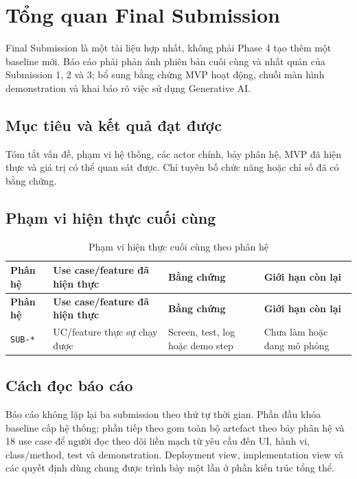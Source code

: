 \section{Tổng quan Final Submission}

Final Submission là một tài liệu hợp nhất, không phải Phase 4 tạo thêm một baseline mới. Báo cáo phải phản ánh phiên bản cuối cùng và nhất quán của Submission 1, 2 và 3; bổ sung bằng chứng MVP hoạt động, chuỗi màn hình demonstration và khai báo rõ việc sử dụng Generative AI.

\subsection{Mục tiêu và kết quả đạt được}

Tóm tắt vấn đề, phạm vi hệ thống, các actor chính, bảy phân hệ, MVP đã hiện thực và giá trị có thể quan sát được. Chỉ tuyên bố chức năng hoặc chỉ số đã có bằng chứng.

\subsection{Phạm vi hiện thực cuối cùng}

\begin{longtable}{|L{25mm}|L{42mm}|L{38mm}|L{30mm}|}
  \caption{Phạm vi hiện thực cuối cùng theo phân hệ}\\
  \hline
  \textbf{Phân hệ} & \textbf{Use case/feature đã hiện thực} & \textbf{Bằng chứng} & \textbf{Giới hạn còn lại}\\\hline
  \endfirsthead
  \hline
  \textbf{Phân hệ} & \textbf{Use case/feature đã hiện thực} & \textbf{Bằng chứng} & \textbf{Giới hạn còn lại}\\\hline
  \endhead
  \texttt{SUB-*} & UC/feature thực sự chạy được & Screen, test, log hoặc demo step & Chưa làm hoặc đang mô phỏng\\\hline
\end{longtable}

\subsection{Cách đọc báo cáo}

Báo cáo không lặp lại ba submission theo thứ tự thời gian. Phần đầu khóa baseline cấp hệ thống; phần tiếp theo gom toàn bộ artefact theo bảy phân hệ và 18 use case để người đọc theo dõi liền mạch từ yêu cầu đến UI, hành vi, class/method, test và demonstration. Deployment view, implementation view và các quyết định dùng chung được trình bày một lần ở phần kiến trúc tổng thể.
